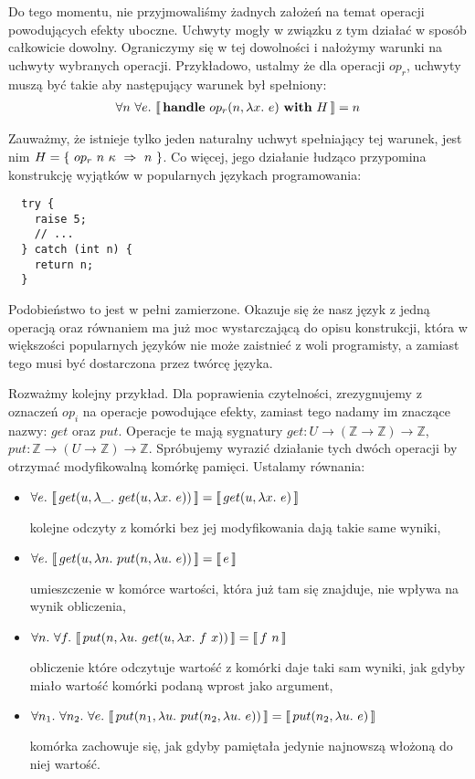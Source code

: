 Do tego momentu, nie przyjmowaliśmy żadnych założeń na temat operacji powodujących efekty uboczne. Uchwyty mogły w związku z tym działać w sposób całkowicie dowolny. Ograniczymy się w tej dowolności i nałożymy warunki na uchwyty wybranych operacji. Przykładowo, ustalmy że dla operacji \(op_r\), uchwyty muszą być takie aby następujący warunek był spełniony:
\begin{align}
  \forall n\ \forall e.\ \llbracket\, \mathbf{handle}\ op_r(n, \lambda x.\ e)\ \mathbf{with}\ H\, \rrbracket = n
\end{align}


Zauważmy, że istnieje tylko jeden naturalny uchwyt spełniający tej warunek, jest nim \(H = \{\ \hcase{op_r}{n\ \kappa}{n} \ \}\). Co więcej, jego działanie łudząco przypomina konstrukcję wyjątków w popularnych językach programowania:

\begin{lstlisting}
  try {
    raise 5;
    // ...
  } catch (int n) {
    return n;
  }
\end{lstlisting}

Podobieństwo to jest w pełni zamierzone. Okazuje się że nasz język z jedną operacją oraz równaniem ma już moc wystarczającą do opisu konstrukcji, która w większości popularnych języków nie może zaistnieć z woli programisty, a zamiast tego musi być dostarczona przez twórcę języka.

Rozważmy kolejny przykład. Dla poprawienia czytelności, zrezygnujemy z oznaczeń \(op_i\) na operacje powodujące efekty, zamiast tego nadamy im znaczące nazwy: \(get\) oraz \(put\). Operacje te mają sygnatury \(get: U \rightarrow (\mathbb{Z} \rightarrow \mathbb{Z}) \rightarrow \mathbb{Z}\), \(put: \mathbb{Z} \rightarrow (U \rightarrow \mathbb{Z}) \rightarrow \mathbb{Z}\). Spróbujemy wyrazić działanie tych dwóch operacji by otrzymać modyfikowalną komórkę pamięci. Ustalamy równania:

\begin{itemize}
\item \(\forall e.\ \llbracket\, get(u, \lambda \_.\ get(u, \lambda x.\ e))\, \rrbracket = \llbracket\, get(u, \lambda x.\ e)\, \rrbracket\)

  kolejne odczyty z komórki bez jej modyfikowania dają takie same wyniki,
\item \(\forall e.\ \llbracket\, get(u, \lambda n.\ put(n, \lambda u.\ e))\, \rrbracket = \llbracket\, e\, \rrbracket\)

  umieszczenie w komórce wartości, która już tam się znajduje, nie wpływa na wynik obliczenia,
\item \(\forall n.\ \forall f.\ \llbracket\, put(n, \lambda u.\ get(u, \lambda x.\ f\ x))\, \rrbracket = \llbracket\, f\ n\, \rrbracket\)

  obliczenie które odczytuje wartość z komórki daje taki sam wyniki, jak gdyby miało wartość komórki podaną wprost jako argument,
\item \(\forall n_1.\ \forall n_2.\ \forall e.\ \llbracket\, put(n_1, \lambda u.\ put(n_2, \lambda u.\ e))\, \rrbracket = \llbracket\, put(n_2, \lambda u.\ e)\, \rrbracket\)

  komórka zachowuje się, jak gdyby pamiętała jedynie najnowszą włożoną do niej wartość.
\end{itemize}

